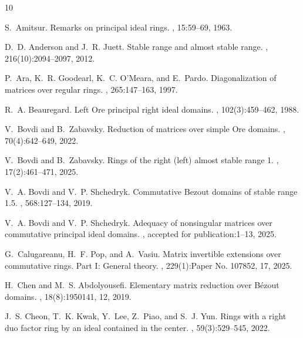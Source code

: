 \documentclass{cimart}
\begin{document}



{\small
\begin{thebibliography}{10}

S.~Amitsur.
\newblock Remarks on principal ideal rings.
, 15:59--69, 1963.

D.~D. Anderson and J.~R. Juett.
\newblock Stable range and almost stable range.
, 216(10):2094--2097, 2012.

P.~Ara, K.~R. Goodearl, K.~C. O'Meara, and E.~Pardo.
\newblock Diagonalization of matrices over regular rings.
, 265:147--163, 1997.

R.~A. Beauregard.
\newblock Left {O}re principal right ideal domains.
, 102(3):459--462, 1988.

V.~Bovdi and B.~Zabavsky.
\newblock Reduction of matrices over simple {O}re domains.
, 70(4):642--649, 2022.

V.~Bovdi and B.~Zabavsky.
\newblock Rings of the right (left) almost stable range 1.
, 17(2):461--471, 2025.

V.~A. Bovdi and V.~P. Shchedryk.
\newblock Commutative {B}ezout domains of stable range 1.5.
, 568:127--134, 2019.

V.~A. Bovdi and V.~P. Shchedryk.
\newblock Adequacy of nonsingular matrices over commutative principal ideal
  domains.
, accepted for
  publication:1--13, 2025.

G.~Calugareanu, H.~F. Pop, and A.~Vasiu.
\newblock Matrix invertible extensions over commutative rings. {P}art {I}:
  {G}eneral theory.
, 229(1):Paper No. 107852, 17, 2025.

H.~Chen and M.~S. Abdolyousefi.
\newblock Elementary matrix reduction over {B}\'{e}zout domains.
, 18(8):1950141, 12, 2019.

J.~S. Cheon, T.~K. Kwak, Y.~Lee, Z.~Piao, and S.~J. Yun.
\newblock Rings with a right duo factor ring by an ideal contained in the
  center.
, 59(3):529--545, 2022.


\end{thebibliography}}
\end{document}

